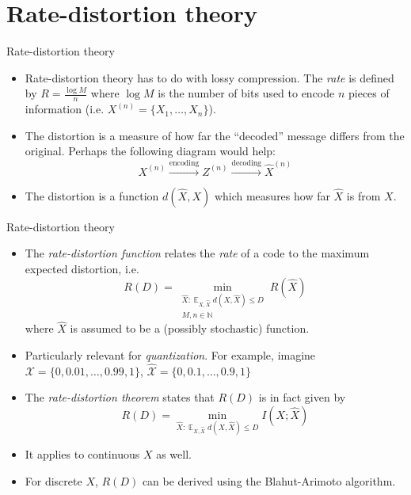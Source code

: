 \documentclass{beamer}
\DeclareMathOperator{\E}{\mathbb{E}}
\begin{document}
\section{Rate-distortion theory}
\begin{frame}{Rate-distortion theory}
\begin{itemize}
	\item Rate-distortion theory has to do with lossy compression. The \emph{rate} is defined by $R = \frac{\log M}{n}$ where $\log M$ is the number of bits used to encode $n$ pieces of information (i.e. $X^{(n)}=\{X_1, \ldots, X_n \}$). 
	\item The distortion is a measure of how far the ``decoded'' message differs from the original. Perhaps the following diagram would help: 
	\[  
		X^{(n)} \overset{\text{encoding}}{\rightarrow} Z^{(n)} \overset{\text{decoding}}{\rightarrow}  \hat{X}^{(n)}
	\]
	\item The distortion is a function $d(\hat{X},X)$ which measures how far $\hat{X}$ is from $X$. 
\end{itemize}
\end{frame}

\begin{frame}{Rate-distortion theory}
\begin{itemize}
	\item 	The \emph{rate-distortion function} relates the \emph{rate} of a code to the maximum expected distortion, i.e. 
	\[
	R(D) = \underset{\substack{\hat{X}: \E_{X, \hat{X}} d(X, \hat{X}) \leq D \\ M, n \in \mathbb{N}}}{\min} R(\hat{X})
	\]
	where $\hat{X}$ is assumed to be a (possibly stochastic) function.
	\item Particularly relevant for \emph{quantization}. For example, imagine $\mathcal{X} = \{0, 0.01, \ldots, 0.99, 1 \}$, $\hat{\mathcal{X}} = \{0, 0.1, \ldots, 0.9, 1 \}$
	\item The \emph{rate-distortion theorem} states that $R(D)$ is in fact given by
	\[
			R(D) = \underset{\hat{X}: \E_{X, \hat{X}} d(X, \hat{X}) \leq D }{\min} I(X; \hat{X})
	\]
	\item It applies to continuous $X$ as well.
	\item For discrete $X$, $R(D)$ can be derived using the Blahut-Arimoto algorithm. 
\end{itemize}
\end{frame}
\end{document}
